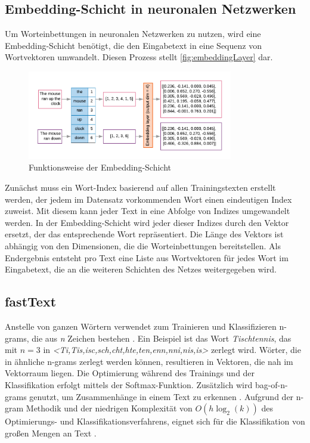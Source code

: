 \subsection*{Embedding-Schicht in neuronalen Netzwerken}

Um Worteinbettungen in neuronalen Netzwerken zu nutzen, wird eine Embedding-Schicht benötigt, die den Eingabetext in eine Sequenz von Wortvektoren umwandelt. Diesen Prozess stellt \autoref{fig:embeddingLayer} dar.

\begin{figure}[H]
  \centering
  \includegraphics[width=0.8\textwidth]{data/images/embedding_layer.png}
  \caption{Funktionsweise der Embedding-Schicht \autocite{google_prepare_2022}} \label{fig:embeddingLayer}
\end{figure}

Zunächst muss ein Wort-Index basierend auf allen Trainingstexten erstellt werden, der jedem im Datensatz vorkommenden Wort einen eindeutigen Index zuweist. Mit diesem kann jeder Text in eine Abfolge von Indizes umgewandelt werden. In der Embedding-Schicht wird jeder dieser Indizes durch den Vektor ersetzt, der das entsprechende Wort repräsentiert. Die Länge des Vektors ist abhängig von den Dimensionen, die die Worteinbettungen bereitstellen. Als Endergebnis entsteht pro Text eine Liste aus Wortvektoren für jedes Wort im Eingabetext, die an die weiteren Schichten des Netzes weitergegeben wird.

\subsection*{fastText}

Anstelle von ganzen Wörtern verwendet \ft zum Trainieren und Klassifizieren n-grams, die aus \textit{n} Zeichen bestehen \autocite{kowsari_text_2019, joulin_fasttextzip_2016}. Ein Beispiel ist das Wort \textit{Tischtennis}, das mit \(n = 3\) in \textit{<Ti,Tis,isc,sch,cht,hte,ten,enn,nni,nis,is>} zerlegt wird. Wörter, die in ähnliche n-grams zerlegt werden können, resultieren in Vektoren, die nah im Vektorraum liegen. Die Optimierung während des Trainings und der Klassifikation erfolgt mittels der Softmax-Funktion. Zusätzlich wird bag-of-n-grams genutzt, um Zusammenhänge in einem Text zu erkennen \autocite[2]{joulin_bag_2016}. Aufgrund der n-gram Methodik und der niedrigen Komplexität von \(O(h \log_{2}(k))\) des Optimierungs- und Klassifikationsverfahrens, eignet sich \ft für die Klassifikation von großen Mengen an Text \autocite[2\psqq]{joulin_bag_2016}.

